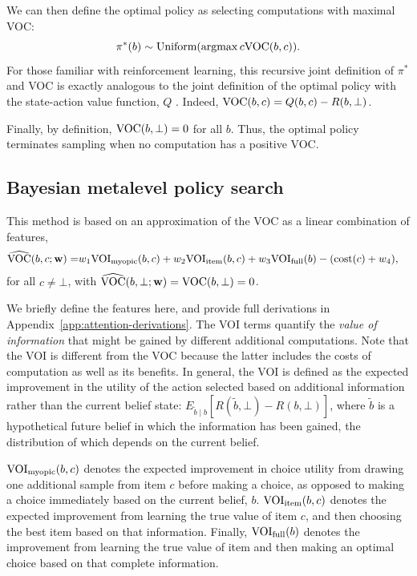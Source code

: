 We can then define the optimal policy as selecting computations with maximal VOC:
$$
\pi^*(b) \sim \text{Uniform}(\operatorname*{argmax}{c} \text{VOC}(b, c)).
$$
For those familiar with reinforcement learning, this recursive joint definition of $\pi^*$ and VOC is exactly analogous to the joint definition of the optimal policy with the state-action value function, $Q$ \citep{sutton2018reinforcement}. Indeed, $\text{VOC}(b, c) = Q(b, c) - R(b, \bot)$. 

Finally, by definition, $\text{VOC}(b,\bot)=0$ for all $b$. Thus, the optimal policy terminates sampling when no computation has a positive VOC.

\subsection{Bayesian metalevel policy search}\label{sec:BMPS}

This method is based on an approximation of the VOC as a linear combination of features,
\begin{equation}\label{eq:vochat}
  \begin{aligned}
    \widehat{\text{VOC}}(b, c; \mathbf{w}) =& w_{1}\text{VOI}_\text{myopic}(b,c)+w_{2}\text{VOI}_\text{item}(b,c) +
     w_{3}\text{VOI}_\text{full}(b) -(\text{cost}(c)+w_{4}),
  \end{aligned}
\end{equation}
for all $c\neq\bot$, with $\widehat{\text{VOC}}(b, \bot; \mathbf{w}) = \text{VOC}(b,\bot)=0$.

We briefly define the features here, and provide full derivations in Appendix~\ref{app:attention-derivations}. The VOI terms quantify the \textit{value of information} \citep{howard1966information} that might be gained by different additional computations. Note that the VOI is different from the VOC because the latter includes the costs of computation as well as its benefits. In general, the VOI is defined as the expected improvement in the utility of the action selected based on additional information rather than the current belief state: $E_{\tilde{b} \mid b}[R(\tilde{b}, \bot) - R(b, \bot)]$, where $\tilde{b}$ is a hypothetical future belief in which the information has been gained, the distribution of which depends on the current belief.

$\text{VOI}_\text{myopic}(b,c)$ denotes the expected improvement in choice utility from drawing one additional sample from item $c$ before making a choice, as opposed to making a choice immediately based on the current belief, $b$. $\text{VOI}_\text{item}(b,c)$ denotes the expected improvement from learning the true value of item $c$, and then choosing the best item based on that information. Finally, $\text{VOI}_\text{full}(b)$ denotes the improvement from learning the true value of  item and then making an optimal choice based on that complete information.

